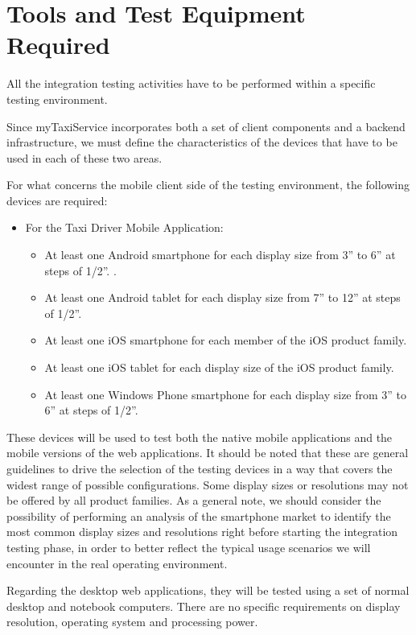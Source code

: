 \chapter{Tools and Test Equipment Required}
All the integration testing activities have to be performed within a specific testing environment. 

Since myTaxiService incorporates both a set of client components and a backend infrastructure, we must define the characteristics of the devices that have to be used in each of these two areas.

For what concerns the mobile client side of the testing environment, the following devices are required:
\begin{itemize}
	\item For the Taxi Driver Mobile Application:
		\begin{itemize}
		\item At least one Android smartphone for each display size from 3” to 6” at steps of 1/2”. .
		\item At least one Android tablet for each display size from 7” to 12” at steps of 1/2”. 
		\item At least one iOS smartphone for each member of the iOS product family.
		\item At least one iOS tablet for each display size of the iOS product family.
		\item At least one Windows Phone smartphone for each display size from 3” to 6” at steps of 1/2”. 
		\end{itemize}
\end{itemize}
These devices will be used to test both the native mobile applications and the mobile versions of the web applications.
It should be noted that these are general guidelines to drive the selection of the testing devices in a way that covers the widest range of possible configurations. Some display sizes or resolutions may not be offered by all product families. 
As a general note, we should consider the possibility of performing an analysis of the smartphone market to identify the most common display sizes and resolutions right before starting the integration testing phase, in order to better reflect the typical usage scenarios we will encounter in the real operating environment. 

Regarding the desktop web applications, they will be tested using a set of normal desktop and notebook computers. There are no specific requirements on display resolution, operating system and processing power.

